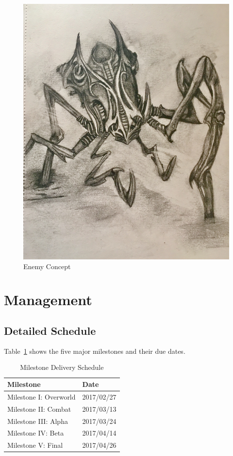 \documentclass[12pt,titlepage]{article}
\begin{document}
\begin{figure}[H]
    \caption{Enemy Concept}
    \label{fig:enemy_concept}
    \centering
    \includegraphics[width=0.35\textheight]{../../graphics/spider}
\end{figure}

\newpage
\section{Management}

\subsection{Detailed Schedule}

Table~\ref{tab:milestones} shows the five major milestones and their due dates.

\begin{table}[H]
    \caption{Milestone Delivery Schedule}
    \label{tab:milestones}
    \centering
    \begin{tabular}{|l|l|}
        \hline
        \textbf{Milestone} & \textbf{Date} \\
        \hline\hline
        Milestone I: Overworld & 2017/02/27 \\
        \hline
        Milestone II: Combat & 2017/03/13 \\
        \hline
        Milestone III: Alpha & 2017/03/24 \\
        \hline
        Milestone IV: Beta & 2017/04/14 \\
        \hline
        Milestone V: Final & 2017/04/26 \\
        \hline
    \end{tabular}
\end{table}
\end{document}
